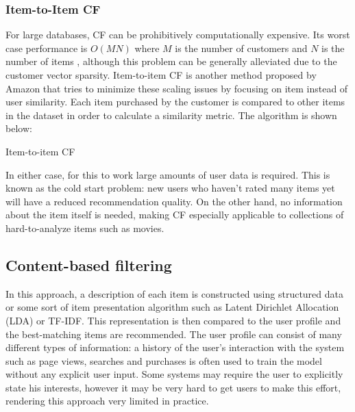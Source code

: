 \documentclass[cic,tc,english]{iiufrgs}
\begin{document}
\subsubsection{Item-to-Item CF}
For large databases, CF can be prohibitively computationally expensive. Its worst case performance is \(O(MN)\) where \(M\) is the number of customers and \(N\) is the number of items \cite{Linden2003}, although this problem can be generally alleviated due to the customer vector sparsity. Item-to-item CF is another method proposed by Amazon that tries to minimize these scaling issues by focusing on item instead of user similarity. Each item purchased by the customer is compared to other items in the dataset in order to calculate a similarity metric. The algorithm is shown below:

\begin{algorithm}[H]
 \caption{Item-to-item CF}
\end{algorithm}

In either case, for this to work large amounts of user data is required. This is known as the cold start problem: new users who haven't rated many items yet will have a reduced recommendation quality. On the other hand, no information about the item itself is needed, making CF especially applicable to collections of hard-to-analyze items such as movies.

\subsection{Content-based filtering}
In this approach, a description of each item is constructed using structured data or some sort of item presentation algorithm such as Latent Dirichlet Allocation (LDA) or TF-IDF. This representation is then compared to the user profile and the best-matching items are recommended. The user profile can consist of many different types of information: a history of the user's interaction with the system such as page views, searches and purchases is often used to train the model without any explicit user input. Some systems may require the user to explicitly state his interests, however it may be very hard to get users to make this effort, rendering this approach very limited in practice.
\end{document}
